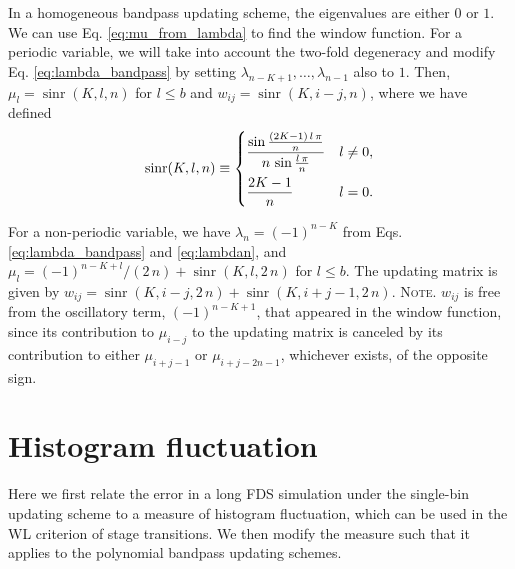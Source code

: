 \documentclass[reprint, superscriptaddress, floatfix]{revtex4-1}
\newcommand{\note}[1]{{\color{DarkGreen}\footnotesize \textsc{Note.} #1}}
\begin{document}
In a homogeneous bandpass updating scheme,
the eigenvalues are either $0$ or $1$.
%
We can use Eq. \eqref{eq:mu_from_lambda}
to find the window function.
%
For a periodic variable,
we will take into account the two-fold degeneracy
and modify Eq. \eqref{eq:lambda_bandpass}
by setting $\lambda_{n-K+1}, \dots, \lambda_{n-1}$
also to $1$.
%
Then, $\mu_l = \operatorname{sinr}(K, l, n)$ for $l \le b$
and $w_{ij} = \operatorname{sinr}(K, i-j, n)$,
where we have defined
\begin{equation}
  \operatorname{sinr}(K, l, n)
  \equiv
  \begin{dcases}
    \frac{
      \sin
      \frac{ (2 K - 1) \, l \, \pi }
           {              n        }
    }
    {
      n \, \sin \frac{ l \, \pi } { n }
    }
    & l \ne 0, \\
    \frac{2K-1}{n} & l = 0.
  \end{dcases}
\notag
\end{equation}
%

For a non-periodic variable,
we have $\lambda_n = (-1)^{n-K}$
from Eqs. \eqref{eq:lambda_bandpass} and \eqref{eq:lambdan},
and $\mu_l = (-1)^{n-K+l}/(2 \, n) + \operatorname{sinr}(K, l, 2 \, n)$
for $l \le b$.
%
The updating matrix is given by
$w_{ij} = \operatorname{sinr}(K, i-j, 2 \, n) + \operatorname{sinr}(K, i+j-1, 2 \, n)$.
%
\note{$w_{ij}$
  is free from the oscillatory term, $(-1)^{n-K+1}$,
  that appeared in the window function, since
  its contribution to $\mu_{i-j}$ to the updating matrix
  is canceled by its contribution to either $\mu_{i+j-1}$
  or $\mu_{i+j-2n-1}$,
  whichever exists, of the opposite sign.}
%



\section{\label{sec:hfluc}
Histogram fluctuation}


Here we first relate the error
in a long FDS simulation under the single-bin updating scheme
to a measure of histogram fluctuation,
which can be used in the WL criterion of stage transitions.
%
We then modify the measure
such that it applies to
the polynomial bandpass updating schemes.
\end{document}
